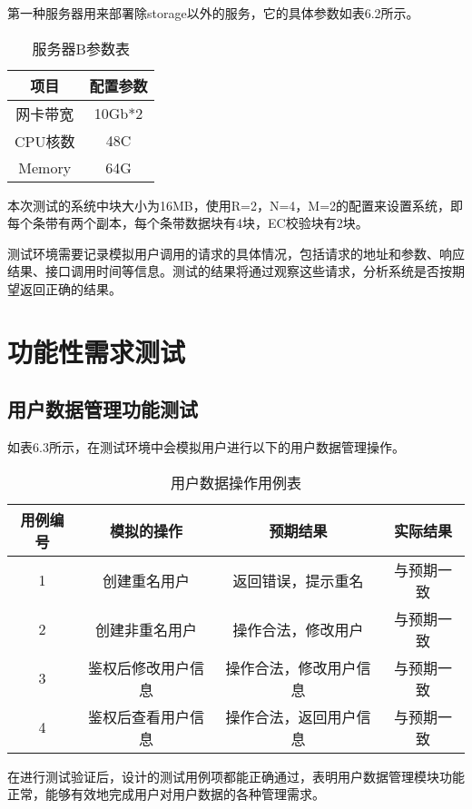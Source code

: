第一种服务器用来部署除storage以外的服务，它的具体参数如表6.2所示。

\begin{table}[h]
    \centering
    \caption{服务器B参数表}
    \begin{tabular}{cc}
      \toprule
      项目   & 配置参数   \\
      \midrule
      网卡带宽  & 10Gb*2  \\
      CPU核数   & 48C     \\
      Memory   & 64G      \\
      \bottomrule
    \end{tabular}
\end{table}

本次测试的系统中块大小为16MB，使用R=2，N=4，M=2的配置来设置系统，即每个条带有两个副本，每个条带数据块有4块，EC校验块有2块。

测试环境需要记录模拟用户调用的请求的具体情况，包括请求的地址和参数、响应结果、接口调用时间等信息。测试的结果将通过观察这些请求，分析系统是否按期望返回正确的结果。

\section{功能性需求测试}

\subsection{用户数据管理功能测试}

如表6.3所示，在测试环境中会模拟用户进行以下的用户数据管理操作。

\begin{table}[h]
  \centering
  \caption{用户数据操作用例表}
  \begin{tabular}{cccc}
    \toprule
    用例编号 & 模拟的操作   & 预期结果   & 实际结果 \\
    \midrule
    1 & 创建重名用户        & 返回错误，提示重名      & 与预期一致 \\
    2 & 创建非重名用户      & 操作合法，修改用户      & 与预期一致   \\
    3 & 鉴权后修改用户信息   & 操作合法，修改用户信息  & 与预期一致    \\
    4 & 鉴权后查看用户信息   & 操作合法，返回用户信息  & 与预期一致    \\
    \bottomrule
  \end{tabular}
\end{table}

在进行测试验证后，设计的测试用例项都能正确通过，表明用户数据管理模块功能正常，能够有效地完成用户对用户数据的各种管理需求。

